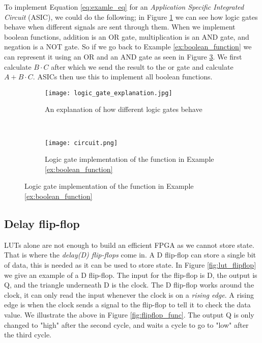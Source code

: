 To implement Equation \ref{eq:examle_eq} for an \textit{Application Specific
Integrated Circuit} (ASIC), we could do the following; in Figure
\ref{fig:logic_gate_explanation} we can see how logic gates behave when
different signals are sent through them. When we implement boolean functions,
addition is an OR gate, multiplication is an AND gate, and negation is a NOT
gate. So if we go back to Example \ref{ex:boolean_function} we can represent it
using an OR and an AND gate as seen in Figure \ref{fig:logic_gate_impl}. We
first calculate $B \cdot C$ after which we send the result to the or gate and
calculate $A + B \cdot C$. ASICs then use this to implement all boolean
functions.

\begin{figure}[H]
    \centering
    \begin{subfigure}[b]{.8\textwidth}
        \centering
        \texttt{[image: logic\_gate\_explanation.jpg]}
        \caption{An explanation of how different logic gates behave
            \citep{LogicGateBehavior}}
        \label{fig:logic_gate_explanation}
    \end{subfigure}
    ~
    \begin{subfigure}[b]{.4\textwidth}
        \centering
        \texttt{[image: circuit.png]}
        \caption{Logic gate implementation of the function in Example
            \ref{ex:boolean_function}}
        \label{fig:logic_gate_impl}
    \end{subfigure}
\end{figure}


\subsection{Delay flip-flop}
LUTs alone are not enough to build an efficient FPGA as we cannot store
state. That is where the \textit{delay(D) flip-flops} come in. A D flip-flop
can store a single bit of data, this is needed as it can be used to
store state. In Figure \ref{fig:lut_flipflop} we give an example of a D
flip-flop. The input for the flip-flop is D, the output is Q, and the triangle
underneath D is the clock. The D flip-flop works around the clock, it can only
read the input whenever the clock is on a \textit{rising edge}. A rising edge
is when the clock sends a signal to the flip-flop to tell it to check the data
value. We illustrate the above in Figure \ref{fig:flipflop_func}. The output
Q is only changed to "high" after the second cycle, and waits a cycle to go to
"low" after the third cycle.


